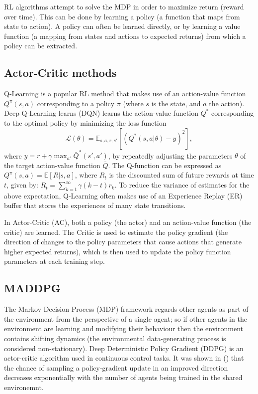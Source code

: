 \documentclass[11pt,a4paper]{article}
\begin{document}
RL algorithms attempt to solve the MDP in order to maximize return (reward over time).
This can be done by learning a policy (a function that maps from state to action).
A policy can often be learned directly, or by learning a value function (a mapping from states and actions to expected returns) from which a policy can be extracted.

\subsection{Actor-Critic methods}

Q-Learning is a popular RL method that makes use of an action-value function $Q^\pi(s, a)$ corresponding to a policy $\pi$ (where $s$ is the state, and $a$ the action).
Deep Q-Learning learns (DQN) learns the action-value function $Q^*$ corresponding to the optimal policy by minimizing the loss function
\begin{equation}
  \mathcal{L}(\theta)=\mathbb{E}_{s,a,r,s'}[(Q^*(s,a|\theta)-y)^2],
\end{equation}
where $y=r+\gamma\max_{a'}\bar{Q}^*(s',a')$,
by repeatedly adjusting the parameters $\theta$ of the target action-value function $\bar{Q}$.
The Q-function can be expressed as $Q^{\pi}(s,a)=\mathbb{E}[R|s,a]$, where $R_t$ is the discounted sum of future rewards at time $t$, given by: $R_t=\sum_{k=t}^\infty\gamma(k-t)r_k$.
To reduce the variance of estimates for the above expectation, Q-Learning often makes use of an Experience Replay (ER) buffer that stores the experiences of many state transitions.

In Actor-Critic (AC), both a policy (the actor) and an action-value function (the critic) are learned.
The Critic is used to estimate the policy gradient (the direction of changes to the policy parameters that cause actions that generate higher expected returns),
which is then used to update the policy function parameters at each training step.

\subsection{MADDPG}

The Markov Decision Process (MDP) framework regards other agents as part of the environment from the perspective of a single agent;
so if other agents in the environment are learning and modifying their behaviour then the environment contains shifting dynamics (the environmental data-generating process is considered non-stationary).
Deep Deterministic Policy Gradient (DDPG) is an actor-critic algorithm used in continuous control tasks.
It was shown in () that the chance of sampling a policy-gradient update in an improved direction decreases exponentially with the number of agents being trained in the shared environemnt.
\end{document}
